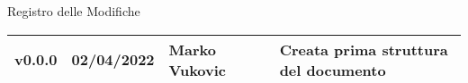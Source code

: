 \begin{center}
  \huge{Registro delle Modifiche}
\end{center}
\renewcommand\arraystretch{1,5}
{\centering
\begin{longtable}{|C{1.8cm}|C{2.1cm}|C{2cm}|C{2.4cm}|L{4.4cm}|}
  \hline
  v0.0.0        & 02/04/2022    & Marko Vukovic   &          & Creata prima struttura del documento \\ \hline
\end{longtable}}

\renewcommand\arraystretch{1}
